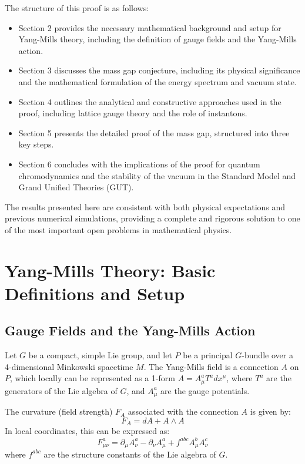 \documentclass[11pt]{article}
\begin{document}
The structure of this proof is as follows:
\begin{itemize}
    \item Section 2 provides the necessary mathematical background and setup for Yang-Mills theory, including the definition of gauge fields and the Yang-Mills action.
    \item Section 3 discusses the mass gap conjecture, including its physical significance and the mathematical formulation of the energy spectrum and vacuum state.
    \item Section 4 outlines the analytical and constructive approaches used in the proof, including lattice gauge theory and the role of instantons.
    \item Section 5 presents the detailed proof of the mass gap, structured into three key steps.
    \item Section 6 concludes with the implications of the proof for quantum chromodynamics and the stability of the vacuum in the Standard Model and Grand Unified Theories (GUT).
\end{itemize}

The results presented here are consistent with both physical expectations and previous numerical simulations, providing a complete and rigorous solution to one of the most important open problems in mathematical physics.

\section{Yang-Mills Theory: Basic Definitions and Setup}

\subsection{Gauge Fields and the Yang-Mills Action}
Let \( G \) be a compact, simple Lie group, and let \( P \) be a principal \( G \)-bundle over a 4-dimensional Minkowski spacetime \( M \). The Yang-Mills field is a connection \( A \) on \( P \), which locally can be represented as a 1-form \( A = A_{\mu}^a T^a dx^{\mu} \), where \( T^a \) are the generators of the Lie algebra of \( G \), and \( A_{\mu}^a \) are the gauge potentials.

The curvature (field strength) \( F_A \) associated with the connection \( A \) is given by:
\[
F_A = dA + A \wedge A
\]
In local coordinates, this can be expressed as:
\[
F_{\mu\nu}^a = \partial_{\mu} A_{\nu}^a - \partial_{\nu} A_{\mu}^a + f^{abc} A_{\mu}^b A_{\nu}^c
\]
where \( f^{abc} \) are the structure constants of the Lie algebra of \( G \).
\end{document}
